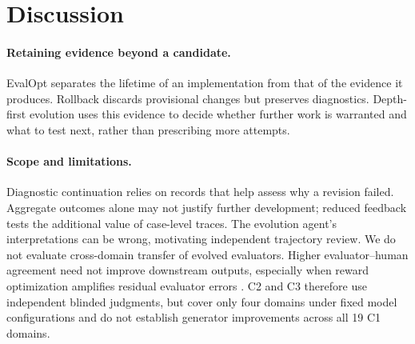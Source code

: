 \section{Discussion}
\label{sec:discussion}

\paragraph{Retaining evidence beyond a candidate.}
EvalOpt separates the lifetime of an implementation from that of the evidence it produces.
Rollback discards provisional changes but preserves diagnostics.
Depth-first evolution uses this evidence to decide whether further work is warranted and what to test next, rather than prescribing more attempts.

\paragraph{Scope and limitations.}
Diagnostic continuation relies on records that help assess why a revision failed.
Aggregate outcomes alone may not justify further development; reduced feedback tests the additional value of case-level traces.
The evolution agent's interpretations can be wrong, motivating independent trajectory review.
We do not evaluate cross-domain transfer of evolved evaluators.
Higher evaluator--human agreement need not improve downstream outputs, especially when reward optimization amplifies residual evaluator errors \citep{wang2026rewardhacking}.
C2 and C3 therefore use independent blinded judgments, but cover only four domains under fixed model configurations and do not establish generator improvements across all 19 C1 domains.
